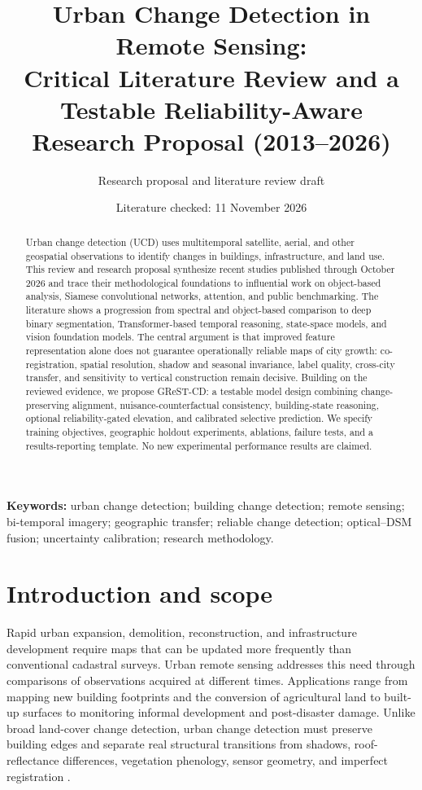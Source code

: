 \documentclass[11pt,a4paper]{article}
\title{Urban Change Detection in Remote Sensing: \\Critical Literature Review and a Testable Reliability-Aware Research Proposal (2013--2026)}
\author{Research proposal and literature review draft}
\date{Literature checked: 11 November 2026}
\begin{document}
\maketitle

\begin{abstract}
Urban change detection (UCD) uses multitemporal satellite, aerial, and other geospatial observations to identify changes in buildings, infrastructure, and land use. This review and research proposal synthesize recent studies published through October 2026 and trace their methodological foundations to influential work on object-based analysis, Siamese convolutional networks, attention, and public benchmarking. The literature shows a progression from spectral and object-based comparison to deep binary segmentation, Transformer-based temporal reasoning, state-space models, and vision foundation models. The central argument is that improved feature representation alone does not guarantee operationally reliable maps of city growth: co-registration, spatial resolution, shadow and seasonal invariance, label quality, cross-city transfer, and sensitivity to vertical construction remain decisive. Building on the reviewed evidence, we propose GReST-CD: a testable model design combining change-preserving alignment, nuisance-counterfactual consistency, building-state reasoning, optional reliability-gated elevation, and calibrated selective prediction. We specify training objectives, geographic holdout experiments, ablations, failure tests, and a results-reporting template. No new experimental performance results are claimed.
\end{abstract}

\noindent\textbf{Keywords:} urban change detection; building change detection; remote sensing; bi-temporal imagery; geographic transfer; reliable change detection; optical--DSM fusion; uncertainty calibration; research methodology.

\section{Introduction and scope}

Rapid urban expansion, demolition, reconstruction, and infrastructure development require maps that can be updated more frequently than conventional cadastral surveys. Urban remote sensing addresses this need through comparisons of observations acquired at different times. Applications range from mapping new building footprints and the conversion of agricultural land to built-up surfaces to monitoring informal development and post-disaster damage. Unlike broad land-cover change detection, urban change detection must preserve building edges and separate real structural transitions from shadows, roof-reflectance differences, vegetation phenology, sensor geometry, and imperfect registration \citep{Gomroki2026,ChengReview2024}.
\end{document}
